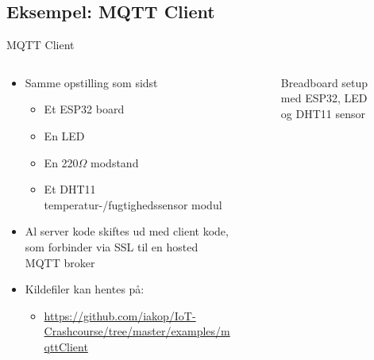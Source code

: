 \documentclass[aspectratio=169]{beamer}
\begin{document}
\subsection{Eksempel: MQTT Client}
\begin{frame}{MQTT Client}
\begin{columns}
	\begin{column}{0.6\textwidth}
		\begin{textBox}
		\begin{itemize}
			\item Samme opstilling som sidst
			\begin{itemize}
				\item Et ESP32 board
				\item En LED
				\item En 220{\textsf{$\Omega$}} modstand
				\item Et DHT11 temperatur-/fugtighedssensor modul
			\end{itemize}
			\item Al server kode skiftes ud med client kode, som forbinder via SSL til en hosted MQTT broker
			\item Kildefiler kan hentes på:
			\begin{itemize}
				\item \tiny\url{https://github.com/iakop/IoT-Crashcourse/tree/master/examples/mqttClient}
			\end{itemize}
		\end{itemize}
		\end{textBox}
	\end{column}
	\begin{column}{0.4\textwidth}
		\centering
		\begin{figure}
  			
  			\caption{Breadboard setup med ESP32, LED og DHT11 sensor}
  			\label{fig:esp32-led-dht11-2}
		\end{figure}
	\end{column}
\end{columns}
\end{frame}
\end{document}
